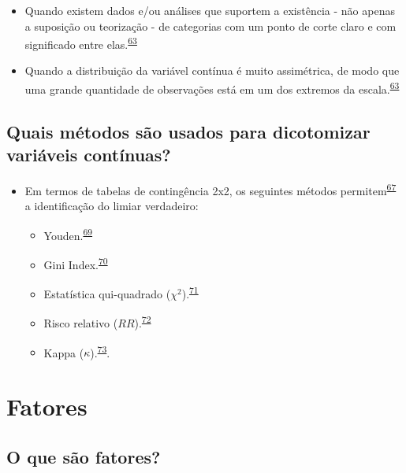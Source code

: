 \documentclass[
  a4paper,
]{book}
\begin{document}
\begin{itemize}
\item
  Quando existem dados e/ou análises que suportem a existência - não apenas a suposição ou teorização - de categorias com um ponto de corte claro e com significado entre elas.\textsuperscript{\protect\hyperlink{ref-MacCallum2002}{63}}
\item
  Quando a distribuição da variável contínua é muito assimétrica, de modo que uma grande quantidade de observações está em um dos extremos da escala.\textsuperscript{\protect\hyperlink{ref-MacCallum2002}{63}}
\end{itemize}

\hypertarget{quais-muxe9todos-suxe3o-usados-para-dicotomizar-variuxe1veis-contuxednuas}{%
\subsection{Quais métodos são usados para dicotomizar variáveis contínuas?}\label{quais-muxe9todos-suxe3o-usados-para-dicotomizar-variuxe1veis-contuxednuas}}

\begin{itemize}
\item
  Em termos de tabelas de contingência 2x2, os seguintes métodos permitem\textsuperscript{\protect\hyperlink{ref-Prince2017}{67}} a identificação do limiar verdadeiro:

  \begin{itemize}
  \item
    Youden.\textsuperscript{\protect\hyperlink{ref-YOUDEN1950}{69}}
  \item
    Gini Index.\textsuperscript{\protect\hyperlink{ref-strobl2007}{70}}
  \item
    Estatística qui-quadrado (\(\chi^2\)).\textsuperscript{\protect\hyperlink{ref-pearson1900}{71}}
  \item
    Risco relativo (\(RR\)).\textsuperscript{\protect\hyperlink{ref-Greiner2000}{72}}
  \item
    Kappa (\(\kappa\)).\textsuperscript{\protect\hyperlink{ref-fleiss1971}{73}}.
  \end{itemize}
\end{itemize}

\hypertarget{fatores}{%
\section{Fatores}\label{fatores}}

\hypertarget{o-que-suxe3o-fatores}{%
\subsection{O que são fatores?}\label{o-que-suxe3o-fatores}}
\end{document}
